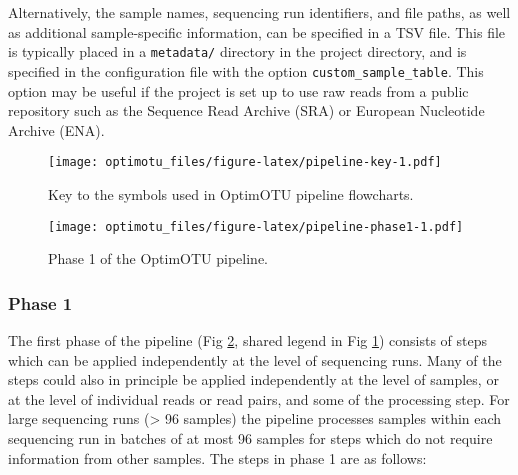 \documentclass[
]{article}
\begin{document}
Alternatively, the sample names, sequencing run identifiers, and file paths, as well as additional sample-specific information, can be specified in a TSV file.
This file is typically placed in a \texttt{metadata/} directory in the project directory, and is specified in the configuration file with the option \texttt{custom\_sample\_table}.
This option may be useful if the project is set up to use raw reads from a public repository such as the Sequence Read Archive (SRA) or European Nucleotide Archive (ENA).

\begin{figure}
\centering
\texttt{[image: optimotu\_files/figure-latex/pipeline-key-1.pdf]}
\caption{\label{fig:pipeline-key}Key to the symbols used in OptimOTU pipeline flowcharts.}
\end{figure}

\begin{figure}
\centering
\texttt{[image: optimotu\_files/figure-latex/pipeline-phase1-1.pdf]}
\caption{\label{fig:pipeline-phase1}Phase 1 of the OptimOTU pipeline.}
\end{figure}

\subsubsection{Phase 1}\label{phase-1}

The first phase of the pipeline (Fig \ref{fig:pipeline-phase1}, shared legend in Fig \ref{fig:pipeline-key}) consists of steps which can be applied independently at the level of sequencing runs.
Many of the steps could also in principle be applied independently at the level of samples, or at the level of individual reads or read pairs, and some of the processing step.
For large sequencing runs (\textgreater{} 96 samples) the pipeline processes samples within each sequencing run in batches of at most 96 samples for steps which do not require information from other samples.
The steps in phase 1 are as follows:
\end{document}
